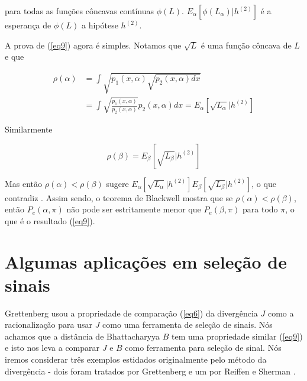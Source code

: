 \documentclass{sbrt2017port}
\begin{document}
para todas as funções côncavas contínuas $\phi(L)$. {$E_\alpha[\phi (L_\alpha)|h^{(2)}]$ é a esperança de $\phi(L)$ a hipótese $h^{(2)}$}.

A prova de (\ref{eq9}) agora é simples. Notamos que $\sqrt{L}$ é uma função côncava de $L$ e que

\begin{equation}\label{eq11}
	\begin{split}
	\rho(\alpha) & = \int {\sqrt{p_1(x,\alpha)\sqrt{p_2(x,\alpha)dx}}} \\
	& = \int{\sqrt{\frac{p_1(x,\alpha)}{p_2(x,\alpha)}}p_2(x,\alpha)dx} = E_\alpha[\sqrt{L_\alpha}|h^{(2)}]
 	\end{split}
\end{equation}

Similarmente

$$ \rho(\beta) = E_\beta[\sqrt{L_\beta}|h^{(2)}]$$

Mas então $\rho(\alpha) < \rho(\beta) $ sugere $E_\alpha[\sqrt{L_\alpha}|h^{(2)}]E_\beta[\sqrt{L_\beta}|h^{(2)}] $, o que contradiz \cite{r10}. Assim sendo, o teorema de Blackwell mostra que se $\rho(\alpha) < \rho(\beta) $, então $P_e(\alpha,\pi)$ não pode ser estritamente menor que $ P_e(\beta,\pi)$ para todo $\pi$, o que é o resultado (\ref{eq9}).

\section{Algumas aplicações em seleção de sinais} \label{sec3}


Grettenberg \cite{r10} usou a propriedade de comparação (\ref{eq6}) da divergência $J$ como a racionalização para usar $J$ como uma ferramenta de seleção de sinais. Nós achamos que a distância de Bhattacharyya $B$ tem uma propriedade similar (\ref{eq9}) e isto nos leva a comparar $J$ e $B$ como ferramenta para seleção de sinal. Nós iremos considerar três exemplos estidados originalmente pelo método da divergência - dois foram tratados por Grettenberg \cite{r10} e um por Reiffen e Sherman \cite{r20}.
\end{document}
